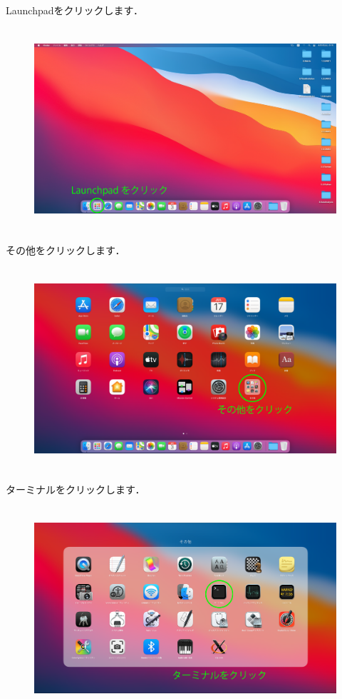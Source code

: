 \documentclass{jarticle}
\begin{document}
Launchpadをクリックします．
\begin{figure}[H]
  \centering
  \includegraphics[height=7.5cm,pagebox=cropbox,clip]{fig/MacDesktopClickLaunchpad.png}
\end{figure}

\newpage
その他をクリックします．
\begin{figure}[H]
  \centering
  \includegraphics[height=7.5cm]{fig/MacLaunchpadClickOther.png}
\end{figure}

ターミナルをクリックします．
\begin{figure}[H]
  \centering
  \includegraphics[height=7.5cm]{fig/MacLaunchpadOtherClickTerminal.png}
\end{figure}
\end{document}
